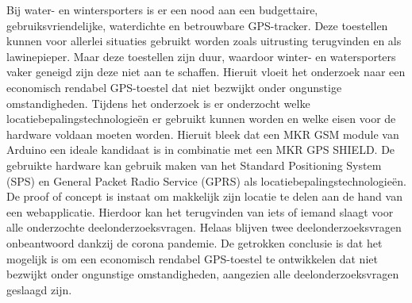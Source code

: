 Bij water- en wintersporters is er een nood aan een budgettaire, gebruiksvriendelijke, waterdichte en betrouwbare GPS-tracker. Deze toestellen kunnen voor allerlei situaties gebruikt worden zoals uitrusting terugvinden en als lawinepieper. Maar deze toestellen zijn duur, waardoor winter- en watersporters vaker geneigd zijn deze niet aan te schaffen. Hieruit vloeit het onderzoek naar een economisch rendabel GPS-toestel dat niet bezwijkt onder ongunstige omstandigheden. Tijdens het onderzoek is er onderzocht welke locatiebepalingstechnologieën er gebruikt kunnen worden en welke eisen voor de hardware voldaan moeten worden. Hieruit bleek dat een MKR GSM module van Arduino een ideale kandidaat is in combinatie met een MKR GPS SHIELD. De gebruikte hardware kan gebruik maken van het Standard Positioning System (SPS) en General Packet Radio Service (GPRS) als locatiebepalingstechnologieën. De proof of concept is instaat om makkelijk zijn locatie te delen aan de hand van een webapplicatie. Hierdoor kan het terugvinden van iets of iemand slaagt voor alle onderzochte deelonderzoeksvragen. Helaas blijven twee deelonderzoeksvragen onbeantwoord dankzij de corona pandemie. De getrokken conclusie is dat het mogelijk is om een economisch rendabel GPS-toestel te ontwikkelen dat niet bezwijkt onder ongunstige omstandigheden, aangezien alle deelonderzoeksvragen geslaagd zijn.